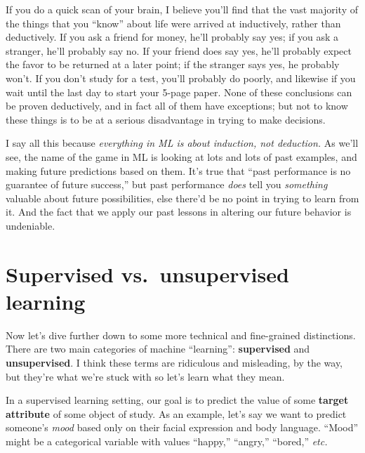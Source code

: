 If you do a quick scan of your brain, I believe you'll find that the vast
majority of the things that you ``know'' about life were arrived at
inductively, rather than deductively. If you ask a friend for money, he'll
probably say yes; if you ask a stranger, he'll probably say no. If your friend
does say yes, he'll probably expect the favor to be returned at a later point;
if the stranger says yes, he probably won't. If you don't study for a test,
you'll probably do poorly, and likewise if you wait until the last day to start
your 5-page paper. None of these conclusions can be proven deductively, and in
fact all of them have exceptions; but not to know these things is to be at a
serious disadvantage in trying to make decisions.

I say all this because \textit{everything in ML is about induction, not
deduction.} As we'll see, the name of the game in ML is looking at lots and
lots of past examples, and making future predictions based on them. It's true
that ``past performance is no guarantee of future success,'' but past
performance \textit{does} tell you \textit{something} valuable about future
possibilities, else there'd be no point in trying to learn from it. And the
fact that we apply our past lessons in altering our future behavior is
undeniable.

\section{Supervised vs.~unsupervised learning}


Now let's dive further down to some more technical and fine-grained
distinctions. There are two main categories of machine ``learning'':
\textbf{supervised} and \textbf{unsupervised}. I think these terms are
ridiculous and misleading, by the way, but they're what we're stuck with so
let's learn what they mean.


In a supervised learning setting, our goal is to predict the value of some
\textbf{target attribute} of some object of study. As an example, let's say we
want to predict someone's \textit{mood} based only on their facial expression
and body language. ``Mood'' might be a categorical variable with values
``\textsf{happy},'' ``\textsf{angry},'' ``\textsf{bored},'' \textit{etc.}

